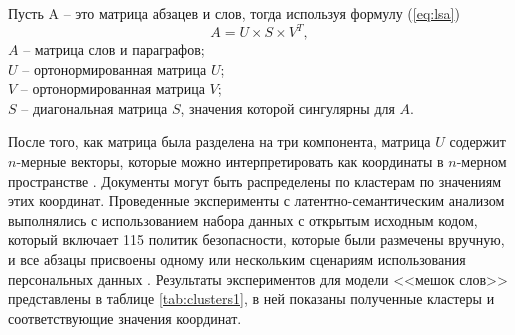 \documentclass[../main]{subfiles}
\begin{document}
Пусть A -- это матрица абзацев и слов, тогда используя формулу (\ref{eq:lsa})
\begin{equation}
    \label{eq:lsa}
    A = U \times S \times V^T,
\end{equation}
$A$ -- матрица слов и параграфов;\\
\makebox[12.5mm]{\hfill}$U$ -- ортонормированная матрица $U$;\\
\makebox[12.5mm]{\hfill}$V$ -- ортонормированная матрица $V$;\\
\makebox[12.5mm]{\hfill}$S$ -- диагональная матрица $S$, значения которой сингулярны для $A$.

После того, как матрица была разделена на три компонента, матрица $U$ содержит $n$-мерные векторы, которые можно интерпретировать как координаты в $n$-мерном пространстве \cite{LSA}. Документы могут быть распределены по кластерам по значениям этих координат. Проведенные эксперименты с латентно-семантическим анализом выполнялись с использованием набора данных с открытым исходным кодом, который включает 115 политик безопасности, которые были размечены вручную, и все абзацы присвоены одному или нескольким сценариям использования персональных данных \cite{OPP}. Результаты экспериментов для модели <<мешок слов>> представлены в таблице \ref{tab:clusters1}, в ней показаны полученные кластеры и соответствующие значения координат.
\end{document}
